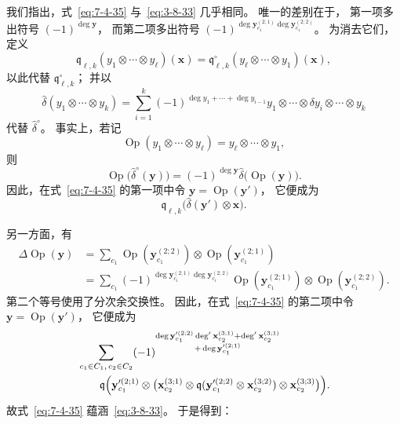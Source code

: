 
我们指出，式~\eqref{eq:7-4-35}
与~\eqref{eq:3-8-33}
几乎相同。
唯一的差别在于，
第一项多出符号
$(-1)^{\deg\mathbf y}$，
而第二项多出符号
$(-1)^{
\deg\mathbf y_{c_1}^{(2;1)}
\deg\mathbf y_{c_1}^{(2;2)}}$。
为消去它们，定义
\begin{equation}
\mathfrak q_{\ell,k}
(y_1\otimes\cdots\otimes y_\ell)
(\mathbf x)
=\mathfrak q^{\circ}_{\ell,k}
(y_\ell\otimes\cdots\otimes y_1)
(\mathbf x),
\tag{7.4.39.1}\label{eq:7-4-39-1}
\end{equation}
以此代替 $\mathfrak q^{\circ}_{\ell,k}$；
并以
\begin{equation}
\widehat\delta
(y_1\otimes\cdots\otimes y_k)
=\sum_{i=1}^{k}
(-1)^{\deg y_1+\cdots+\deg y_{i-1}}
y_1\otimes\cdots\otimes
\delta y_i\otimes\cdots\otimes y_k
\tag{7.4.39.2}\label{eq:7-4-39-2}
\end{equation}
代替 $\widehat\delta^{\circ}$。
事实上，若记
\[
\operatorname{Op}
(y_1\otimes\cdots\otimes y_\ell)
=y_\ell\otimes\cdots\otimes y_1,
\]
则
\begin{equation}
\operatorname{Op}
\bigl(\widehat\delta^{\circ}(\mathbf y)\bigr)
=(-1)^{\deg\mathbf y}
\widehat\delta
\bigl(\operatorname{Op}(\mathbf y)\bigr).
\tag{7.4.39.3}\label{eq:7-4-39-3}
\end{equation}
因此，在式~\eqref{eq:7-4-35}
的第一项中令
$\mathbf y=\operatorname{Op}(\mathbf y')$，
它便成为
\[
\mathfrak q_{\ell,k}
\bigl(\widehat\delta(\mathbf y')
\otimes\mathbf x\bigr).
\]

另一方面，有
\[
\begin{aligned}
\Delta\operatorname{Op}(\mathbf y)
&=\sum_{c_1}
\operatorname{Op}
(\mathbf y_{c_1}^{(2;2)})
\otimes
\operatorname{Op}
(\mathbf y_{c_1}^{(2;1)})\\
&=\sum_{c_1}
(-1)^{
\deg\mathbf y_{c_1}^{(2;1)}
\deg\mathbf y_{c_1}^{(2;2)}}
\operatorname{Op}
(\mathbf y_{c_1}^{(2;1)})
\otimes
\operatorname{Op}
(\mathbf y_{c_1}^{(2;2)}).
\end{aligned}
\]
第二个等号使用了分次余交换性。
因此，在式~\eqref{eq:7-4-35}
的第二项中令
$\mathbf y=\operatorname{Op}(\mathbf y')$，
它便成为
\[
\begin{aligned}
&\sum_{c_1\in C_1,\,c_2\in C_2}
(-1)^{\substack{
\deg\mathbf y_{c_1}^{\prime(2;2)}
\deg'\mathbf x_{c_2}^{(3;1)}
+\deg'\mathbf x_{c_2}^{(3;1)}\\
+\deg\mathbf y_{c_1}^{\prime(2;1)}}}\\
&\qquad
\mathfrak q\Bigl(
\mathbf y_{c_1}^{\prime(2;1)}
\otimes\bigl(
\mathbf x_{c_2}^{(3;1)}
\otimes
\mathfrak q(
\mathbf y_{c_1}^{\prime(2;2)}
\otimes\mathbf x_{c_2}^{(3;2)})
\otimes\mathbf x_{c_2}^{(3;3)}
\bigr)\Bigr).
\end{aligned}
\]
故式~\eqref{eq:7-4-35}
蕴涵~\eqref{eq:3-8-33}。
于是得到：

